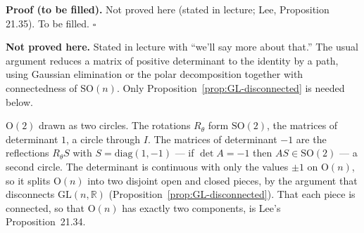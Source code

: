 \documentclass[11pt]{report}
\renewenvironment{proof}[1][Proof]{\noindent\textbf{#1.} }{\hfill$\square$\par\vspace{5pt}}
\newcommand{\GL}{\mathrm{GL}}
\newcommand{\Ogp}{\mathrm{O}}
\newcommand{\SO}{\mathrm{SO}}
\begin{document}
\begin{proof}[Proof (to be filled)]
Not proved here (stated in lecture; Lee, Proposition 21.35). To be filled.
\end{proof}

\textbf{Not proved here.} Stated in lecture with ``we'll say more about that.'' The usual argument reduces a matrix of positive determinant to the identity by a path, using Gaussian elimination or the polar decomposition together with connectedness of $\SO(n)$. Only Proposition~\ref{prop:GL-disconnected} is needed below.


\begin{center}
\end{center}

$\Ogp(2)$ drawn as two circles. The rotations $R_\theta$ form $\SO(2)$, the matrices of determinant $1$, a circle through $I$. The matrices of determinant $-1$ are the reflections $R_\theta S$ with $S = \mathrm{diag}(1, -1)$ --- if $\det A = -1$ then $AS \in \SO(2)$ --- a second circle. The determinant is continuous with only the values $\pm 1$ on $\Ogp(n)$, so it splits $\Ogp(n)$ into two disjoint open and closed pieces, by the argument that disconnects $\GL(n,\mathbb{R})$ (Proposition~\ref{prop:GL-disconnected}). That each piece is connected, so that $\Ogp(n)$ has exactly two components, is Lee's Proposition~21.34.
\end{document}
